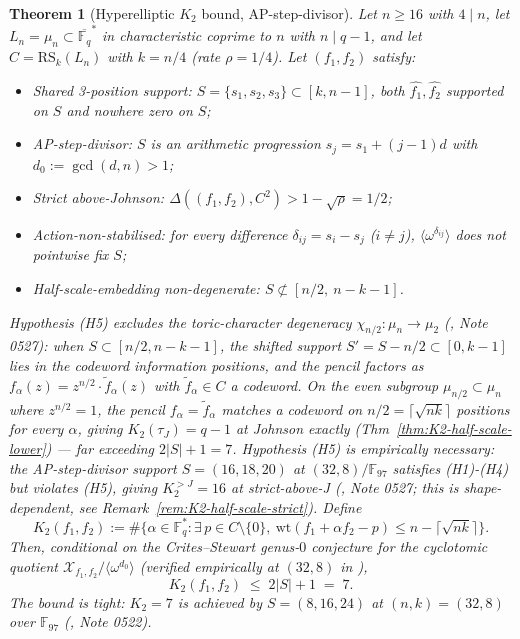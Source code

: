 \documentclass[11pt]{article}
\newtheorem{theorem}{Theorem}[section]
\theoremstyle{definition}
\theoremstyle{remark}
\newcommand{\FF}{\mathbb{F}}
\begin{document}
\begin{theorem}[Hyperelliptic $K_2$ bound, AP-step-divisor]
\label{thm:K2-hyperelliptic-AP-divisor}
Let $n \geq 16$ with $4 \mid n$, let $L_n = \mu_n \subset
\overline{\FF_q}^*$ in characteristic coprime to $n$ with $n \mid q - 1$,
and let $C = \mathrm{RS}_k(L_n)$ with $k = n/4$ (rate $\rho = 1/4$). Let
$(f_1, f_2)$ satisfy:
\begin{itemize}
\item[(H1)] \emph{Shared 3-position support}: $S = \{s_1, s_2, s_3\}
  \subset [k, n-1]$, both $\widehat{f_1}, \widehat{f_2}$ supported on
  $S$ and nowhere zero on $S$;
\item[(H2)] \emph{AP-step-divisor}: $S$ is an arithmetic progression
  $s_j = s_1 + (j-1) d$ with $d_0 := \gcd(d, n) > 1$;
\item[(H3)] \emph{Strict above-Johnson}:
  $\Delta((f_1, f_2), C^2) > 1 - \sqrt\rho = 1/2$;
\item[(H4)] \emph{Action-non-stabilised}: for every difference
  $\delta_{ij} = s_i - s_j$ ($i \neq j$), $\langle \omega^{\delta_{ij}}
  \rangle$ does not pointwise fix $S$;
\item[(H5)] \emph{Half-scale-embedding non-degenerate}:
  $S \not\subset [n/2,\ n - k - 1]$.
\end{itemize}

\noindent
Hypothesis (H5) excludes the toric-character degeneracy $\chi_{n/2}: \mu_n \to \mu_2$
(\cite{CompanionRepo}, Note 0527): when $S \subset [n/2, n-k-1]$, the
shifted support $S' = S - n/2 \subset [0, k-1]$ lies in the codeword
information positions, and the pencil factors as
$f_\alpha(z) = z^{n/2} \cdot \widetilde f_\alpha(z)$ with
$\widetilde f_\alpha \in C$ a codeword. On the even subgroup
$\mu_{n/2} \subset \mu_n$ where $z^{n/2} = 1$, the pencil
$f_\alpha = \widetilde f_\alpha$ matches a codeword on $n/2 =
\lceil\sqrt{nk}\rceil$ positions for every $\alpha$, giving
$K_2(\tau_J) = q - 1$ at Johnson exactly
(Thm~\ref{thm:K2-half-scale-lower}) — far exceeding $2|S| + 1 = 7$.
Hypothesis (H5) is empirically necessary: the AP-step-divisor support
$S = (16, 18, 20)$ at $(32, 8)/\FF_{97}$ satisfies (H1)-(H4) but
violates (H5), giving $K_2^{>J} = 16$ at strict-above-J
(\cite{CompanionRepo}, Note 0527; this is shape-dependent, see
Remark~\ref{rem:K2-half-scale-strict}).
Define
\[
 K_2(f_1, f_2) := \#\bigl\{ \alpha \in \FF_q^* : \exists\, p \in C
 \setminus \{0\},\ \mathrm{wt}(f_1 + \alpha f_2 - p) \leq n -
 \lceil\sqrt{nk}\rceil \bigr\}.
\]
Then, conditional on the Crites--Stewart genus-$0$ conjecture for the
cyclotomic quotient $\mathcal{X}_{f_1, f_2} / \langle \omega^{d_0}
\rangle$ (verified empirically at $(32, 8)$ in \cite{CompanionRepo}),
\[
 \boxed{\quad K_2(f_1, f_2) \;\leq\; 2|S| + 1 \;=\; 7. \quad}
\]
The bound is tight: $K_2 = 7$ is achieved by $S = (8, 16, 24)$ at
$(n, k) = (32, 8)$ over $\FF_{97}$ (\cite{CompanionRepo}, Note 0522).
\end{theorem}
\end{document}
